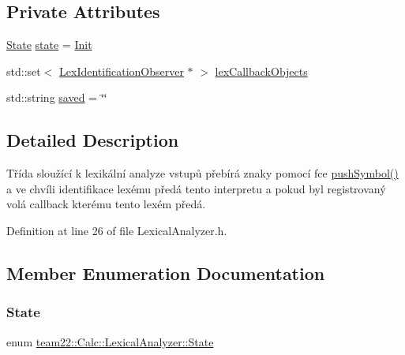 \subsection*{Private Attributes}
\begin{DoxyCompactItemize}
\item 
\hyperlink{classteam22_1_1_calc_1_1_lexical_analyzer_aef11ba66454715a80d5964c07f6d8cc3}{State} \hyperlink{classteam22_1_1_calc_1_1_lexical_analyzer_ad0f4710b09bf91a00d11846a7ef036ab}{state} = \hyperlink{classteam22_1_1_calc_1_1_lexical_analyzer_aef11ba66454715a80d5964c07f6d8cc3a11976214c837f23fd71b2af8b0de3d5b}{Init}
\item 
std\+::set$<$ \hyperlink{classteam22_1_1_calc_1_1_lex_identification_observer}{Lex\+Identification\+Observer} $\ast$ $>$ \hyperlink{classteam22_1_1_calc_1_1_lexical_analyzer_ab8018dc24a6f4e188a901c83bbd9fdb1}{lex\+Callback\+Objects}
\item 
std\+::string \hyperlink{classteam22_1_1_calc_1_1_lexical_analyzer_afd063de2c3d792b5688c863eb5135968}{saved} = \char`\"{}\char`\"{}
\end{DoxyCompactItemize}


\subsection{Detailed Description}
Třída sloužící k lexikální analyze vstupů přebírá znaky pomocí fce \hyperlink{classteam22_1_1_calc_1_1_lexical_analyzer_af56c536f78c680bd635ac1173e65b492}{push\+Symbol()} a ve chvíli identifikace lexému předá tento interpretu a pokud byl registrovaný volá callback kterému tento lexém předá. 

Definition at line 26 of file Lexical\+Analyzer.\+h.



\subsection{Member Enumeration Documentation}
\mbox{\label{classteam22_1_1_calc_1_1_lexical_analyzer_aef11ba66454715a80d5964c07f6d8cc3}} 
\subsubsection{\texorpdfstring{State}{State}}
{\footnotesize\ttfamily enum \hyperlink{classteam22_1_1_calc_1_1_lexical_analyzer_aef11ba66454715a80d5964c07f6d8cc3}{team22\+::\+Calc\+::\+Lexical\+Analyzer\+::\+State}\hspace{0.3cm}{\ttfamily [private]}}

